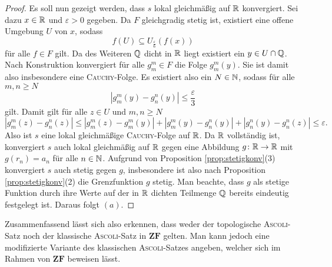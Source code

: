 \begin{proof}
  Es soll nun gezeigt werden, dass $s$ lokal gleichmäßig auf $\mathbb{R}$ konvergiert.
  Sei dazu $x \in \mathbb{R}$ und $\varepsilon > 0$ gegeben.
  Da $F$ gleichgradig stetig ist, existiert eine offene Umgebung $U$ von $x$, sodass
  \begin{displaymath}
    f(U) \subseteq U_\frac{\varepsilon}{6}(f(x))
  \end{displaymath}
  für alle $f \in F$ gilt.
  Da des Weiteren $\mathbb{Q}$ dicht in $\mathbb{R}$ liegt existiert ein $y \in U \cap \mathbb{Q}$.
  Nach Konstruktion konvergiert für alle $g_m^m \in F$ die Folge $g_m^m(y)$.
  Sie ist damit also insbesondere eine \textsc{Cauchy}\hyp{}Folge.
  Es existiert also ein $N \in \mathbb{N}$, sodass für alle $m,n \geq N$
  \begin{displaymath}
    | g_m^m(y) - g_n^n(y) | \leq \frac{\varepsilon}{3}
  \end{displaymath}
  gilt.
  Damit gilt für alle $z \in U$ und $m, n \geq N$
  \begin{displaymath}
    | g_m^m(z) - g_n^n(z) |
    \leq 
    | g_m^m(z) - g_m^m(y) | +  | g_m^m(y) - g_n^n(y) | +  | g_n^n(y) - g_n^n(z) |
    \leq
    \varepsilon.
  \end{displaymath}
  Also ist $s$ eine lokal gleichmäßige \textsc{Cauchy}\hyp{}Folge auf $\mathbb{R}$.
  Da $\mathbb{R}$ vollständig ist, konvergiert $s$ auch lokal gleichmäßig auf $\mathbb{R}$ gegen eine Abbildung $g \colon \mathbb{R} \to \mathbb{R}$ mit $g(r_n) = a_n$ für alle $n \in \mathbb{N}$. 
  Aufgrund von Proposition \ref{prop:stetigkonv}(3) konvergiert $s$ auch stetig gegen $g$, insbesondere ist also nach Proposition \ref{prop:stetigkonv}(2) die Grenzfunktion $g$ stetig.
  Man beachte, dass $g$ als stetige Funktion durch ihre Werte auf der in $\mathbb{R}$ dichten Teilmenge $\mathbb{Q}$ bereits eindeutig festgelegt ist.
  Daraus folgt $(a)$.
\end{proof}

Zusammenfassend lässt sich also erkennen, dass weder der topologische \textsc{Ascoli}\hyp{}Satz noch der klassische \textsc{Ascoli}\hyp{}Satz in $\mathbf{ZF}$ gelten. Man kann jedoch eine modifizierte Variante des klassischen \textsc{Ascoli}\hyp{}Satzes angeben, welcher sich im Rahmen von $\mathbf{ZF}$ beweisen lässt.

